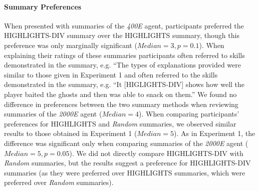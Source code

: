 \paragraph{Summary Preferences}
When presented with summaries of the \emph{400E} agent, participants preferred the HIGHLIGHTS-DIV summary over the HIGHLIGHTS summary, though this preference was only marginally significant ($Median = 3, p=0.1$). When explaining their ratings of these summaries participants often referred to skills demonstrated in the summary, e.g. ``The types of explanations provided were similar to those given in Experiment 1 and often referred to the skills demonstrated in the summary, e.g. ``It [HIGLIGHTS-DIV] shows how well the player baited the ghosts and then was able to snack on them.'' We found no difference in preferences between the two summary methods when reviewing summaries of the \emph{2000E} agent  ($Median = 4$). When comparing participants' preferences for HIGHLIGHTS and \emph{Random} summaries, we observed similar results to those obtained in Experiment 1 ($Median = 5$). As in Experiment 1, the difference was significant only when comparing summaries of the \emph{2000E} agent ($Median = 5, p = 0.05$). We did not directly compare HIGHLIGHTS-DIV with \emph{Random} summaries, but the results suggest a preference for HIGHLIGHTS-DIV summaries (as they were preferred over HIGHLIGHTS summaries, which were preferred over \emph{Random} summaries).  


